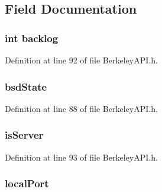 \subsection{Field Documentation}
\hypertarget{struct_b_s_d_socket_a9507e1c27beffe02ed97c7b076a42f24}{}
\subsubsection[{backlog}]{\setlength{\rightskip}{0pt plus 5cm}int backlog}\label{struct_b_s_d_socket_a9507e1c27beffe02ed97c7b076a42f24}


Definition at line 92 of file Berkeley\+A\+P\+I.\+h.

\hypertarget{struct_b_s_d_socket_aa76842716670b8888269696eba685c1e}{}
\subsubsection[{bsd\+State}]{ bsd\+State}\label{struct_b_s_d_socket_aa76842716670b8888269696eba685c1e}


Definition at line 88 of file Berkeley\+A\+P\+I.\+h.

\hypertarget{struct_b_s_d_socket_a9bf807f17580892a625b6ab963140f1e}{}
\subsubsection[{is\+Server}]{ is\+Server}\label{struct_b_s_d_socket_a9bf807f17580892a625b6ab963140f1e}


Definition at line 93 of file Berkeley\+A\+P\+I.\+h.

\hypertarget{struct_b_s_d_socket_af6861e9d9788b339f1aa2da497069de6}{}
\subsubsection[{local\+Port}]{ local\+Port}\label{struct_b_s_d_socket_af6861e9d9788b339f1aa2da497069de6}


